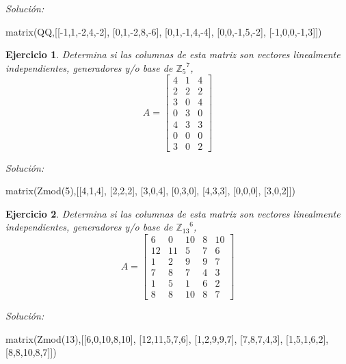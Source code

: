 \documentclass{amsart}
\newtheorem{ejer}{Ejercicio}
\begin{document}
{\it Soluci\'on:}

\begin{sageblock}
matrix(QQ,[[-1,1,-2,4,-2],
[0,1,-2,8,-6],
[0,1,-1,4,-4],
[0,0,-1,5,-2],
[-1,0,0,-1,3]])
\end{sageblock}



\begin{ejer} Determina si las columnas de esta matriz son vectores linealmente independientes, generadores y/o base de ${{\mathbb Z}_{5}}^{7}$,
\[ A = \left[\begin{array}{rrr}
4 & 1 & 4 \\
2 & 2 & 2 \\
3 & 0 & 4 \\
0 & 3 & 0 \\
4 & 3 & 3 \\
0 & 0 & 0 \\
3 & 0 & 2
\end{array}\right] \]
\end{ejer}

{\it Soluci\'on:}

\begin{sageblock}
matrix(Zmod(5),[[4,1,4],
[2,2,2],
[3,0,4],
[0,3,0],
[4,3,3],
[0,0,0],
[3,0,2]])
\end{sageblock}



\begin{ejer} Determina si las columnas de esta matriz son vectores linealmente independientes, generadores y/o base de ${{\mathbb Z}_{13}}^{6}$,
\[ A = \left[\begin{array}{rrrrr}
6 & 0 & 10 & 8 & 10 \\
12 & 11 & 5 & 7 & 6 \\
1 & 2 & 9 & 9 & 7 \\
7 & 8 & 7 & 4 & 3 \\
1 & 5 & 1 & 6 & 2 \\
8 & 8 & 10 & 8 & 7
\end{array}\right] \]
\end{ejer}

{\it Soluci\'on:}

\begin{sageblock}
matrix(Zmod(13),[[6,0,10,8,10],
[12,11,5,7,6],
[1,2,9,9,7],
[7,8,7,4,3],
[1,5,1,6,2],
[8,8,10,8,7]])
\end{sageblock}
\end{document}
